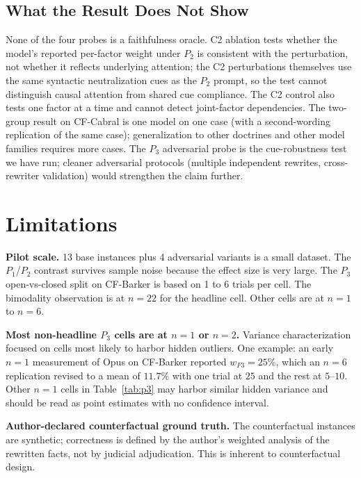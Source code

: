 \documentclass[11pt]{article}
\begin{document}
\subsection{What the Result Does Not Show}

None of the four probes is a faithfulness oracle. C2 ablation tests whether the model's reported per-factor weight under $P_2$ is consistent with the perturbation, not whether it reflects underlying attention; the C2 perturbations themselves use the same syntactic neutralization cues as the $P_2$ prompt, so the test cannot distinguish causal attention from shared cue compliance. The C2 control also tests one factor at a time and cannot detect joint-factor dependencies. The two-group result on CF-Cabral is one model on one case (with a second-wording replication of the same case); generalization to other doctrines and other model families requires more cases. The $P_3$ adversarial probe is the cue-robustness test we have run; cleaner adversarial protocols (multiple independent rewrites, cross-rewriter validation) would strengthen the claim further.

\section{Limitations}
\label{sec:limitations}

\textbf{Pilot scale.} 13 base instances plus 4 adversarial variants is a small dataset. The $P_1$/$P_2$ contrast survives sample noise because the effect size is very large. The $P_3$ open-vs-closed split on CF-Barker is based on 1 to 6 trials per cell. The bimodality observation is at $n=22$ for the headline cell. Other cells are at $n=1$ to $n=6$.

\textbf{Most non-headline $P_3$ cells are at $n=1$ or $n=2$.} Variance characterization focused on cells most likely to harbor hidden outliers. One example: an early $n=1$ measurement of Opus on CF-Barker reported $w_{F3} = 25\%$, which an $n=6$ replication revised to a mean of $11.7\%$ with one trial at $25$ and the rest at $5$--$10$. Other $n=1$ cells in Table~\ref{tab:p3} may harbor similar hidden variance and should be read as point estimates with no confidence interval.

\textbf{Author-declared counterfactual ground truth.} The counterfactual instances are synthetic; correctness is defined by the author's weighted analysis of the rewritten facts, not by judicial adjudication. This is inherent to counterfactual design.
\end{document}
